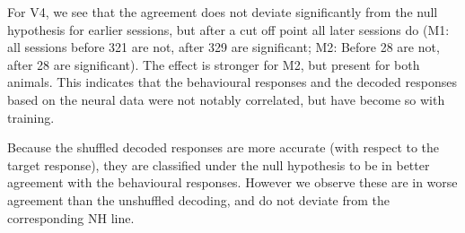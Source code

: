 For \ac{V4}, we see that the agreement does not deviate significantly from the null hypothesis for earlier sessions, but after a cut off point all later sessions do (\ac{M1}: all sessions before 321 are not, after 329 are significant; \ac{M2}: Before 28 are not, after 28 are significant).
The effect is stronger for \ac{M2}, but present for both animals.
This indicates that the behavioural responses and the decoded responses based on the neural data were not notably correlated, but have become so with training.

Because the shuffled decoded responses are more accurate (with respect to the target response), they are classified under the null hypothesis to be in better agreement with the behavioural responses.
However we observe these are in worse agreement than the unshuffled decoding, and do not deviate from the corresponding \ac{NH} line.

%
%

